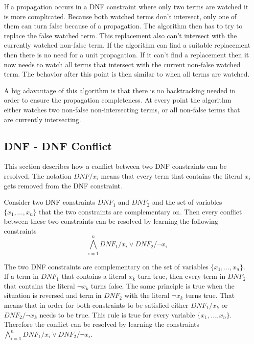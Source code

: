If a propagation occurs in a DNF constraint where only two terms are watched it is more complicated. Because both watched terms don't intersect, only one of them can turn false because of a propagation. The algorithm then has to try to replace the false watched term. This replacement also can't intersect with the currently watched non-false term. If the algorithm can find a suitable replacement then there is no need for a unit propagation. If it can't find a replacement then it now needs to watch all terms that intersect with the current non-false watched term. The behavior after this point is then similar to when all terms are watched.

A big adavantage of this algorithm is that there is no backtracking needed in order to ensure the propagation completeness. At every point the algorithm either watches two non-false non-intersecting terms, or all non-false terms that are currently intersecting.



\subsection{DNF - DNF Conflict}

This section describes how a conflict between two DNF constraints can be resolved. The notation $DNF/x_i$ means that every term that contains the literal $x_i$ gets removed from the DNF constraint.
\begin{leftbar}
Consider two DNF constraints $DNF_1$ and $DNF_2$ and the set of variables $\{x_1,...,x_n\}$ that the two constraints are complementary on. Then every conflict between these two constraints can be resolved by learning the following constraints
\begin{displaymath}
\bigwedge_{i=1}^{n} DNF_1 / x_i \vee DNF_2 / \neg x_i
\end{displaymath}
\end{leftbar}
The two DNF constraints are complementary on the set of variables $\{x_1,...,x_n\}$. If a term in $DNF_1$ that contains a literal $x_k$ turn true, then every term in $DNF_2$ that contains the literal $\neg x_k$ turns false. The same principle is true when the situation is reversed and term in $DNF_2$ with the literal $\neg x_k$ turns true. That means that in order for both constraints to be satisfied either $DNF_1/x_k$ or $DNF_2/\neg x_k$ needs to be true. This rule is true for every variable $\{x_1,...,x_n\}$. Therefore the conflict can be resolved by learning the constraints $\bigwedge_{i=1}^{n} DNF_1 / x_i \vee DNF_2 / \neg x_i$.

